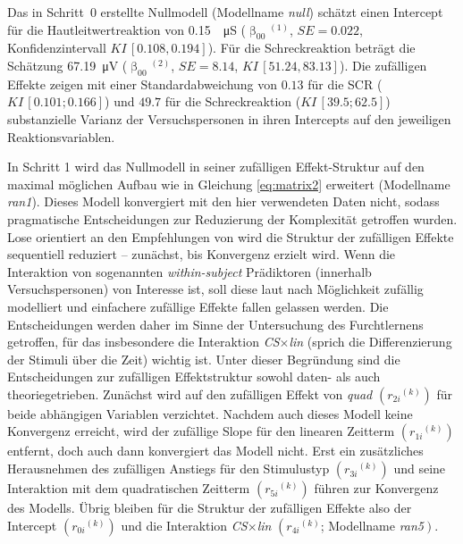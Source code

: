 			Das in Schritt~0 erstellte Nullmodell (Modellname \textit{null}) schätzt einen Intercept für die Hautleitwertreaktion von \SI{0.15}{\log\micro\siemens} ($\upbeta_{00}{}^{(1)}$, $SE=0.022$, Konfidenzintervall $KI\,\left[0.108,0.194\right]$). Für die Schreckreaktion beträgt die Schätzung \SI{67.19}{\micro\volt} ($\upbeta_{00}{}^{(2)}$, $SE=8.14$, $KI\,\left[51.24,83.13\right]$). 
			Die zufälligen Effekte zeigen mit einer Standardabweichung von $0.13$ für die SCR ($KI\,\left[0.101; 0.166\right]$) und $49.7$ für die Schreckreaktion ($KI\,\left[39.5; 62.5\right]$) substanzielle Varianz der Versuchspersonen in ihren Intercepts auf den jeweiligen Reaktionsvariablen.		
			
			In Schritt 1 wird das Nullmodell in seiner zufälligen Effekt-Struktur auf den maximal möglichen Aufbau wie in Gleichung \eqref{eq:matrix2} erweitert (Modellname \textit{ran1}). 
			Dieses Modell konvergiert mit den hier verwendeten Daten nicht, sodass pragmatische Entscheidungen zur Reduzierung der Komplexität getroffen wurden. 
			Lose orientiert an den Empfehlungen von \textcite{BRAUER2018} wird die Struktur der zufälligen Effekte sequentiell reduziert -- zunächst, bis Konvergenz erzielt wird.
			Wenn die Interaktion von sogenannten \textit{within-subject} Prädiktoren (innerhalb Versuchspersonen) von Interesse ist, soll diese laut \textcite{BARR2013} nach Möglichkeit zufällig modelliert und einfachere zufällige Effekte fallen gelassen werden. Die Entscheidungen werden daher im Sinne der Untersuchung des Furchtlernens getroffen, für das insbesondere die Interaktion \textit{CS$\times$lin} (sprich die Differenzierung der Stimuli über die Zeit) wichtig ist. Unter dieser Begründung sind die Entscheidungen zur zufälligen Effektstruktur sowohl daten- als auch theoriegetrieben.
			Zunächst wird auf den zufälligen Effekt von \textit{quad} $\left(r_{2i}{}^{(k)}\right)$ für beide abhängigen Variablen verzichtet.
			Nachdem auch dieses Modell keine Konvergenz erreicht, wird der zufällige Slope für den linearen Zeitterm $\left(r_{1i}{}^{(k)}\right)$ entfernt,
			doch auch dann konvergiert das Modell nicht.
			Erst ein zusätzliches Herausnehmen des zufälligen Anstiegs für den Stimulustyp $\left( r_{3i}{}^{(k)}\right)$ und seine Interaktion mit dem quadratischen Zeitterm $\left( r_{5i}{}^{(k)}\right)$ führen zur Konvergenz des Modells.
			Übrig bleiben für die Struktur der zufälligen Effekte also der Intercept $\left(r_{0i}{}^{(k)}\right)$ und die Interaktion \textit{CS$\times$lin} $\left(r_{4i}{}^{(k)}\right.$; Modellname \textit{ran5}$\left. \right)$.
